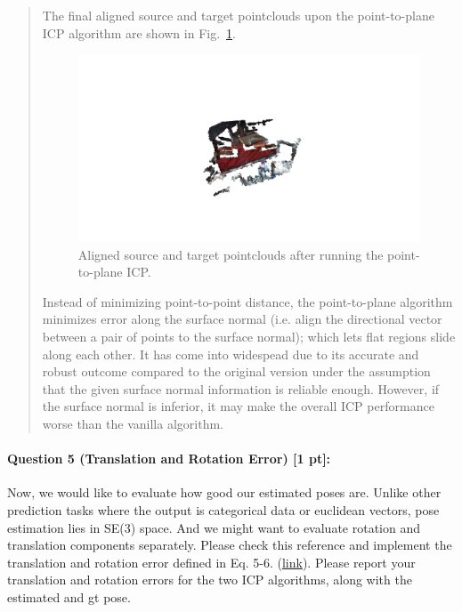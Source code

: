 \documentclass[11pt]{article}
\begin{document}
\begin{quote}
The final aligned source and target pointclouds upon the point-to-plane ICP algorithm are shown in Fig.~\ref{fig:pcds_icp_point2plane}.
\begin{figure}[h]
    \centering
    \includegraphics[width=1.0\linewidth]{pcds_icp_point2plane.jpg}
    \caption{Aligned source and target pointclouds after running the point-to-plane ICP.}
    \label{fig:pcds_icp_point2plane}
\end{figure}


Instead of minimizing point-to-point distance, the point-to-plane algorithm minimizes error along the surface normal (i.e. align the directional vector between a pair of points to the surface normal); which lets flat regions slide along each other. It has come into widespead due to its accurate and robust outcome compared to the original version under the assumption that the given surface normal information is reliable enough. However, if the surface normal is inferior, it may make the overall ICP performance worse than the vanilla algorithm.

\end{quote}


\paragraph{Question 5 (Translation and Rotation Error) [1 pt]:} Now, we would like to evaluate how good our estimated poses are. Unlike other prediction tasks where the output is categorical data or euclidean vectors, pose estimation lies in SE(3) space. And we might want to evaluate rotation and translation components separately. Please check this reference and implement the translation and rotation error defined in Eq. 5-6. (\href{https://cmp.felk.cvut.cz/~hodanto2/data/hodan2016evaluation.pdf}{link}). Please report your translation and rotation errors for the two ICP algorithms, along with the estimated and gt pose.  
\end{document}
